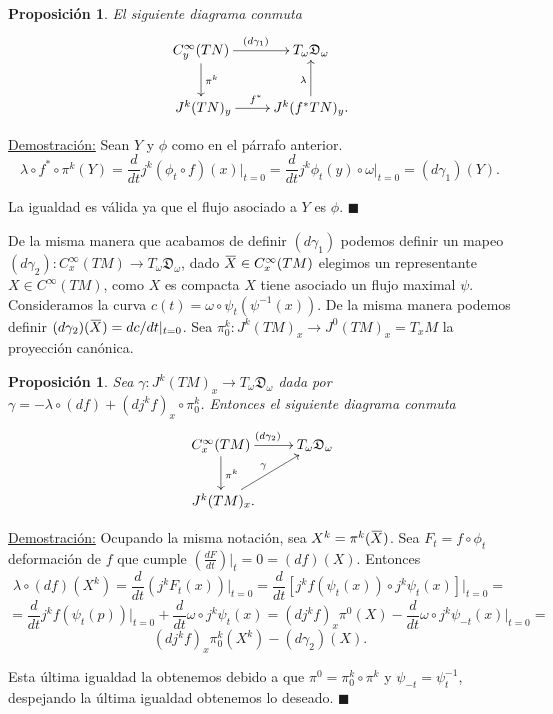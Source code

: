 \documentclass{report}
\newtheorem{prop}[theorem]{Proposici\'on}
\theoremstyle{definition}
\newcommand{\overbar}[1]{\mkern 1.5mu\overline{\mkern-1.5mu#1\mkern-1.5mu}\mkern 1.5mu}
\begin{document}
\begin{prop}
El siguiente diagrama conmuta$$ \xymatrix{
C^\infty_y (TN) \ar[d]^{\pi^k} \ar[r]^{(d\gamma_1)}&T_\omega \mathfrak{D}_\omega \\\
J^k (TN)_y \ar[r]^{f^\ast} & \ar[u]^\lambda  J^k(f^\ast TN)_y .}  $$
\end{prop}

\underline{Demostraci\'on:} Sean $Y$ y $\phi$ como en el p\'arrafo anterior. $$\lambda \circ f^\ast \circ \pi^k(Y) = \frac{d}{d t} j^k (\phi_t \circ f )(x) \vert_{t=0} =\frac{d}{dt} j^k \phi_t(y) \circ \omega \vert_{t=0} = (d \gamma_1)(Y) .$$

La igualdad es v\'alida ya que el flujo asociado a $Y$ es $\phi$. $\blacksquare$

De la misma manera que acabamos de definir $(d\gamma_1)$ podemos definir un mapeo $(d \gamma_2): C^\infty_x (TM) \to T_\omega \mathfrak{D}_\omega$, dado $\overbar{X} \in C^\infty_x (TM)$ elegimos un representante $ X  \in C^\infty (TM)$, como $X$ es compacta $X$ tiene asociado un flujo maximal $\psi$. Consideramos la curva $c(t)= \omega \circ \psi_t (\psi^{-1} (x))$. De la misma manera podemos definir $(d \gamma_2) (\overbar{X}) = dc / dt \vert_{t=0}$. Sea $\pi^k_0: J^k (TM)_x \to J^0 (TM)_x = T_x M$ la proyecci\'on can\'onica.

\begin{prop}
Sea $\gamma:J^k (TM)_x \to T_\omega \mathfrak{D}_\omega$ dada por $\gamma = - \lambda \circ (df) + (d j^k f)_x \circ \pi_0^k$. Entonces el siguiente diagrama conmuta$$
\xymatrix{
C^\infty_x (TM) \ar[r]^{(d\gamma_2)} \ar[d]^{\pi^k} & T_\omega \mathfrak{D}_\omega\\\
 \ar[ur]^\gamma J^k (TM)_x .}$$
\end{prop} 

\underline{Demostraci\'on:} Ocupando la misma notaci\'on, sea $X^k = \pi^k (\overbar{X})$. Sea $F_t= f \circ \phi_t$ deformaci\'on de $f$ que cumple $(\frac{dF}{dt}) \vert_t=0 = (df)(X)$. Entonces $$
\lambda \circ (df) (X^k) = \frac{d}{dt} (j^k F_t(x)) \vert_{t=0} = \frac{d}{dt} [j^k f(\psi_t(x)) \circ j^k \psi_t (x)] \vert_{t=0}=$$
$$= \frac{d}{dt} j^k f(\psi_t(p))\vert_{t=0} + \frac{d}{dt} \omega \circ j^k \psi_t (x) = (d j^k f)_x \pi^0 (X) - \frac{d}{dt} \omega \circ j^k \psi_{-t} (x) \vert_{t=0}=$$
$$(d j^k f)_x \pi^k_0 (X^k) - (d \gamma_2)(X) .$$

Esta \'ultima igualdad la obtenemos debido a que $\pi^0 = \pi^k_0 \circ \pi^k$ y $\psi_{-t} = \psi_t^{-1}$, despejando la \'ultima igualdad obtenemos lo deseado. $\blacksquare$
\end{document}

